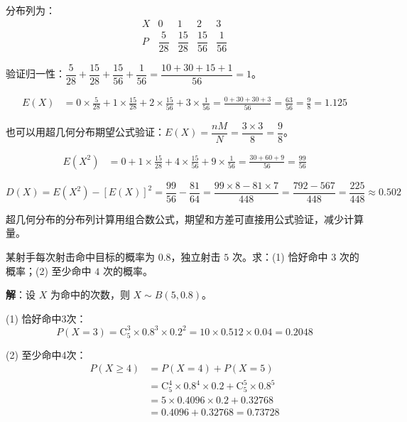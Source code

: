 \documentclass[12pt, a4paper]{ctexart}
\begin{document}
分布列为：
\[
\begin{array}{c|cccc}
X & 0 & 1 & 2 & 3 \\
\hline
P & \dfrac{5}{28} & \dfrac{15}{28} & \dfrac{15}{56} & \dfrac{1}{56}
\end{array}
\]

验证归一性：$\dfrac{5}{28} + \dfrac{15}{28} + \dfrac{15}{56} + \dfrac{1}{56} = \dfrac{10+30+15+1}{56} = 1$。\checkmark

\begin{align*}
E(X) &= 0 \times \frac{5}{28} + 1 \times \frac{15}{28} + 2 \times \frac{15}{56} + 3 \times \frac{1}{56}
= \frac{0 + 30 + 30 + 3}{56} = \frac{63}{56} = \frac{9}{8} = 1.125
\end{align*}

也可以用超几何分布期望公式验证：$E(X) = \dfrac{nM}{N} = \dfrac{3 \times 3}{8} = \dfrac{9}{8}$。\checkmark

\begin{align*}
E(X^2) &= 0 + 1 \times \frac{15}{28} + 4 \times \frac{15}{56} + 9 \times \frac{1}{56}
= \frac{30 + 60 + 9}{56} = \frac{99}{56}
\end{align*}

\[
D(X) = E(X^2) - [E(X)]^2 = \frac{99}{56} - \frac{81}{64} = \frac{99 \times 8 - 81 \times 7}{448} = \frac{792 - 567}{448} = \frac{225}{448} \approx 0.502
\]

\begin{tipbox}[方法总结]
超几何分布的分布列计算用组合数公式，期望和方差可直接用公式验证，减少计算量。
\end{tipbox}

\begin{examplebox}[【例2】二项分布的概率计算]
某射手每次射击命中目标的概率为 $0.8$，独立射击 $5$ 次。求：(1) 恰好命中 $3$ 次的概率；(2) 至少命中 $4$ 次的概率。
\end{examplebox}

\textbf{解}：设 $X$ 为命中的次数，则 $X \sim B(5, 0.8)$。

(1) 恰好命中3次：
\[
P(X=3) = \mathrm{C}_5^3 \times 0.8^3 \times 0.2^2 = 10 \times 0.512 \times 0.04 = 0.2048
\]

(2) 至少命中4次：
\begin{align*}
P(X \geqslant 4) &= P(X=4) + P(X=5) \\
&= \mathrm{C}_5^4 \times 0.8^4 \times 0.2 + \mathrm{C}_5^5 \times 0.8^5 \\
&= 5 \times 0.4096 \times 0.2 + 0.32768 \\
&= 0.4096 + 0.32768 = 0.73728
\end{align*}
\end{document}
